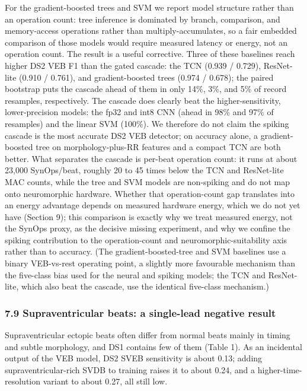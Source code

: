 \documentclass[
]{article}
\begin{document}
For the gradient-boosted trees and SVM we report model structure rather
than an operation count: tree inference is dominated by branch,
comparison, and memory-access operations rather than
multiply-accumulates, so a fair embedded comparison of those models
would require measured latency or energy, not an operation count. The
result is a useful corrective. Three of these baselines reach higher DS2
VEB F1 than the gated cascade: the TCN (0.939 / 0.729), ResNet-lite
(0.910 / 0.761), and gradient-boosted trees (0.974 / 0.678); the paired
bootstrap puts the cascade ahead of them in only 14\%, 3\%, and 5\% of
record resamples, respectively. The cascade does clearly beat the
higher-sensitivity, lower-precision models: the fp32 and int8 CNN (ahead
in 98\% and 97\% of resamples) and the linear SVM (100\%). We therefore
do not claim the spiking cascade is the most accurate DS2 VEB detector;
on accuracy alone, a gradient-boosted tree on morphology-plus-RR
features and a compact TCN are both better. What separates the cascade
is per-beat operation count: it runs at about 23,000 SynOps/beat,
roughly 20 to 45 times below the TCN and ResNet-lite MAC counts, while
the tree and SVM models are non-spiking and do not map onto neuromorphic
hardware. Whether that operation-count gap translates into an energy
advantage depends on measured hardware energy, which we do not yet have
(Section 9); this comparison is exactly why we treat measured energy,
not the SynOps proxy, as the decisive missing experiment, and why we
confine the spiking contribution to the operation-count and
neuromorphic-suitability axis rather than to accuracy. (The
gradient-boosted-tree and SVM baselines use a binary VEB-vs-rest
operating point, a slightly more favourable mechanism than the
five-class bias used for the neural and spiking models; the TCN and
ResNet-lite, which also beat the cascade, use the identical five-class
mechanism.)

\subsubsection{7.9 Supraventricular beats: a single-lead negative
result}\label{supraventricular-beats-a-single-lead-negative-result}

Supraventricular ectopic beats often differ from normal beats mainly in
timing and subtle morphology, and DS1 contains few of them (Table 1). As
an incidental output of the VEB model, DS2 SVEB sensitivity is about
0.13; adding supraventricular-rich SVDB to training raises it to about
0.24, and a higher-time-resolution variant to about 0.27, all still low.
\end{document}
